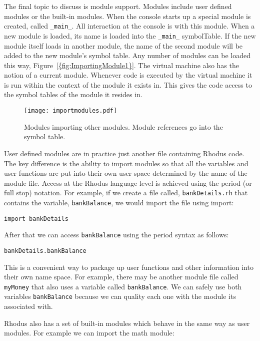 The final topic to discuss is module support. Modules include user defined modules or the built-in modules. When the console starts up a special module is created, called {\tt _main_}. All interaction at the console is with this module. When a new module is loaded, its name is loaded into the {\tt _main_} symbolTable. If the new module itself loads in another module, the name of the second module will be added to the new module's symbol table. Any number of modules can be loaded this way, Figure~\ref{{fig:ImportingModule1}}. The virtual machine also has the notion of a current module. Whenever code is executed by the virtual machine it is run within the context of the module it exists in. This gives the code access to the symbol tables of the module it resides in.

\begin{figure}[htpb]
\centering
\texttt{[image: importmodules.pdf]}
\caption{Modules importing other modules. Module references go into the symbol table.}
\label{fig:ImportingModule1}
\end{figure}

User defined modules are in practice just another file containing Rhodus code. The key difference is the ability to import modules so that all the variables and user functions are put into their own user space determined by the name of the module file. Access at the Rhodus language level is achieved using the period (or full stop) notation. For example, if we create a file called, {\tt bankDetails.rh} that contains the variable, {\tt bankBalance}, we would import the file using import:

\begin{lstlisting}
import bankDetails
\end{lstlisting}

After that we can access {\tt bankBalance} using the period syntax as follows:

\begin{lstlisting}
bankDetails.bankBalance
\end{lstlisting}

This is a convenient way to package up user functions and other information into their own name space. For example, there may be another module file called {\tt myMoney} that also uses a variable called {\tt bankBalance}. We can safely use both variables {\tt bankBalance} because we can quality each one with the module its associated with.

Rhodus also has a set of built-in modules which behave in the same way as user modules. For example we can import the math module:

